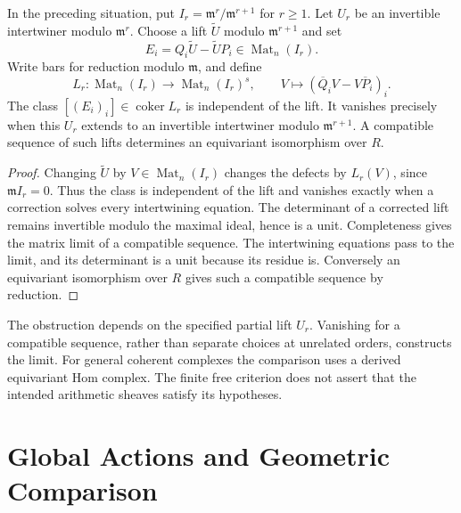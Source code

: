 \begin{proposition}
\label{v4-arith:bcglue-core:cor:part-a-domain-reduction}
In the preceding situation, put
$I_r=\mathfrak m^r/\mathfrak m^{r+1}$ for $r\ge1$.
Let $U_r$ be an invertible intertwiner modulo $\mathfrak m^r$.
Choose a lift $\widetilde U$ modulo $\mathfrak m^{r+1}$ and set
\[
 E_i=Q_i\widetilde U-\widetilde U P_i
       \in\operatorname{Mat}_n(I_r).
\]
Write bars for reduction modulo $\mathfrak m$, and define
\[
 L_r:\operatorname{Mat}_n(I_r)\longrightarrow
       \operatorname{Mat}_n(I_r)^s,
 \qquad V\longmapsto(\overline Q_iV-V\overline P_i)_i.
\]
The class $[(E_i)_i]\in\operatorname{coker}L_r$ is independent
of the lift. It vanishes precisely when this $U_r$ extends to
an invertible intertwiner modulo $\mathfrak m^{r+1}$.
A compatible sequence of such lifts determines an equivariant
isomorphism over $R$.
\end{proposition}

\begin{proof}
Changing $\widetilde U$ by $V\in\operatorname{Mat}_n(I_r)$
changes the defects by $L_r(V)$, since $\mathfrak m I_r=0$.
Thus the class is independent of the lift and vanishes exactly
when a correction solves every intertwining equation.
The determinant of a corrected lift remains invertible modulo the
maximal ideal, hence is a unit. Completeness gives the matrix limit
of a compatible sequence. The intertwining equations pass to the
limit, and its determinant is a unit because its residue is.
Conversely an equivariant isomorphism over $R$ gives such a
compatible sequence by reduction.
\end{proof}

The obstruction depends on the specified partial lift $U_r$.
Vanishing for a compatible sequence, rather than separate choices
at unrelated orders, constructs the limit.
For general coherent complexes the comparison uses a derived
 equivariant Hom complex. The finite free criterion does not assert
that the intended arithmetic sheaves satisfy its hypotheses.

\section{Global Actions and Geometric Comparison}
\label{v4-arith:bcglue-core:global}


